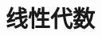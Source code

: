 \part{线性代数}
\begingroup
\def\x{\mat{X}}
\def\y{\mat{Y}}
\def\a{\mat{\alpha}}
\def\b{\mat{\beta}}
\def\e{\mat{\varepsilon}}
\def\g{\mat{\gamma}}
\def\X#1{\x_{#1}}
\def\A{\mat{A}}
\def\B{\mat{B}}
\def\C{\mat{C}}
\def\D{\mat{D}}
\def\P{\mat{P}}
\def\Q{\mat{Q}}
\def\l{\lambda}
\def\L#1{\l_{#1}}
\def\z{\mat{0}}
\def\E{\mat{E}}
\def\V{\mat{\Lambda}}

%
\endgroup
